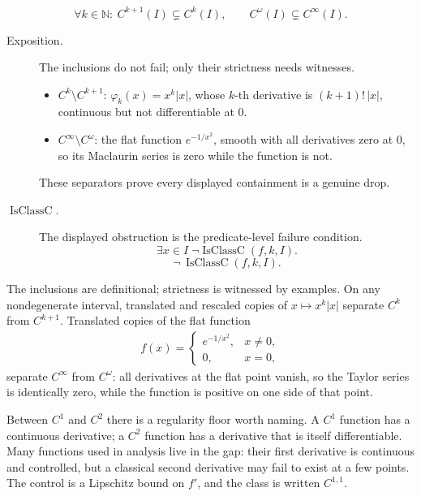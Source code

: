 \begin{remark*}
\[
  \forall k\in\mathbb{N}:\ C^{k+1}(I)\subsetneq C^k(I),
  \qquad
  C^\omega(I)\subsetneq C^\infty(I).
\]
\end{remark*}

\begin{remark*}
\begin{description}
  \item[Exposition.]
The inclusions do not fail; only their strictness needs witnesses.
\begin{itemize}
  \item \(C^k\setminus C^{k+1}\): \(\varphi_k(x)=x^k|x|\), whose \(k\)-th
        derivative is \((k+1)!\,|x|\), continuous but not differentiable at
        \(0\).
  \item \(C^\infty\setminus C^\omega\): the flat function
        \(e^{-1/x^2}\), smooth with all derivatives zero at \(0\), so its
        Maclaurin series is zero while the function is not.
\end{itemize}
These separators prove every displayed containment is a genuine drop.


  \item[\(\operatorname{IsClassC}.\)]
  The displayed obstruction is the predicate-level failure condition.
  \[
  \exists x\in I\;\neg\operatorname{IsClassC}(f,k,I).
  \]
  \[
  \neg\,\operatorname{IsClassC}(f,k,I).
  \]
\end{description}
\end{remark*}

\begin{remark*}[Interpretation]
The inclusions are definitional; strictness is witnessed by examples. On any nondegenerate interval, translated and rescaled copies of \(x\mapsto x^k|x|\) separate \(C^k\) from \(C^{k+1}\). Translated copies of the flat function
\[
\begin{aligned}
  f(x)=
  \begin{cases}
    e^{-1/x^2}, & x\neq 0,\\
    0, & x=0,
  \end{cases}
\end{aligned}
\]
separate \(C^\infty\) from \(C^\omega\): all derivatives at the flat point vanish, so the Taylor series is identically zero, while the function is positive on one side of that point.


Between \(C^1\) and \(C^2\) there is a regularity floor worth naming. A
\(C^1\) function has a continuous derivative; a \(C^2\) function has a
derivative that is itself differentiable. Many functions used in analysis
live in the gap: their first derivative is continuous and controlled, but a
classical second derivative may fail to exist at a few points. The control is
a Lipschitz bound on \(f'\), and the class is written \(C^{1,1}\).
\end{remark*}

